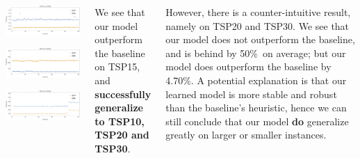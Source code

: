 \documentclass[20pt,,margin=1in,innermargin=-4.5in,blockverticalspace=-0.25in]{tikzposter}
\begin{document}
\begin{columns}
{\begin{center}
\begin{minipage}{0.49\linewidth}
\begin{tikzfigure}
					\includegraphics[width=13cm]{Figures/result/15-20.png}
				\end{tikzfigure}%
			\end{minipage}\hfill
			\begin{minipage}{0.49\linewidth}
				\centering
				\begin{tikzfigure}
					\includegraphics[width=13cm]{Figures/result/15-25.png}
				\end{tikzfigure}%
			\end{minipage}
			\includegraphics[width=27cm]{Figures/result/15-30(from15-15).png}
		\end{center}
		We see that our model outperform the baseline on TSP15, and \textbf{successfully generalize to TSP10, TSP20
			and TSP30}.

		However, there is a counter-intuitive result, namely on TSP20 and TSP30. We see that our model does not
		outperform the baseline, and is behind by 50\%\ on average; but our model does outperform the baseline
		by 4.70\%. A potential explanation is that our learned model is more stable and robust than the
		baseline's heuristic, hence we can still conclude that our model \textbf{do} generalize greatly on larger
		or smaller instances.
	}


\end{columns}
\end{document}
